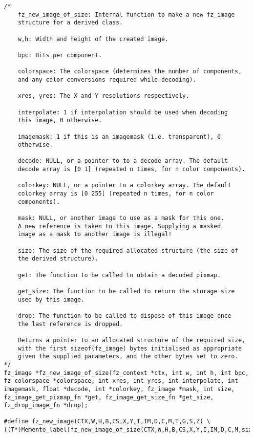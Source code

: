 \documentclass[oneside]{book}
\begin{document}
\begin{lstlisting}
/*
	fz_new_image_of_size: Internal function to make a new fz_image
	structure for a derived class.

	w,h: Width and height of the created image.

	bpc: Bits per component.

	colorspace: The colorspace (determines the number of components,
	and any color conversions required while decoding).

	xres, yres: The X and Y resolutions respectively.

	interpolate: 1 if interpolation should be used when decoding
	this image, 0 otherwise.

	imagemask: 1 if this is an imagemask (i.e. transparent), 0
	otherwise.

	decode: NULL, or a pointer to to a decode array. The default
	decode array is [0 1] (repeated n times, for n color components).

	colorkey: NULL, or a pointer to a colorkey array. The default
	colorkey array is [0 255] (repeated n times, for n color
	components).

	mask: NULL, or another image to use as a mask for this one.
	A new reference is taken to this image. Supplying a masked
	image as a mask to another image is illegal!

	size: The size of the required allocated structure (the size of
	the derived structure).

	get: The function to be called to obtain a decoded pixmap.

	get_size: The function to be called to return the storage size
	used by this image.

	drop: The function to be called to dispose of this image once
	the last reference is dropped.

	Returns a pointer to an allocated structure of the required size,
	with the first sizeof(fz_image) bytes initialised as appropriate
	given the supplied parameters, and the other bytes set to zero.
*/
fz_image *fz_new_image_of_size(fz_context *ctx, int w, int h, int bpc, fz_colorspace *colorspace, int xres, int yres, int interpolate, int imagemask, float *decode, int *colorkey, fz_image *mask, int size, fz_image_get_pixmap_fn *get, fz_image_get_size_fn *get_size, fz_drop_image_fn *drop);

#define fz_new_image(CTX,W,H,B,CS,X,Y,I,IM,D,C,M,T,G,S,Z) \
((T*)Memento_label(fz_new_image_of_size(CTX,W,H,B,CS,X,Y,I,IM,D,C,M,sizeof(T),G,S,Z),#T))
\end{lstlisting}
\end{document}
